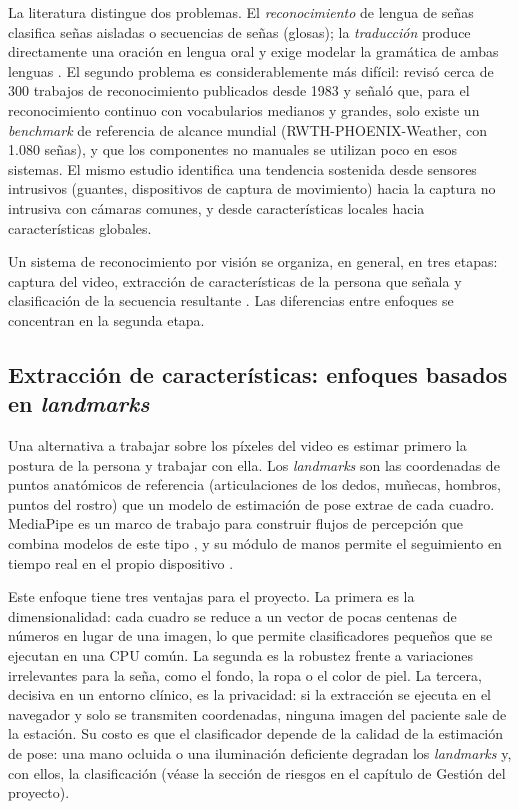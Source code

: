 La literatura distingue dos problemas. El \emph{reconocimiento} de lengua de señas clasifica señas aisladas o secuencias de señas (glosas); la \emph{traducción} produce directamente una oración en lengua oral y exige modelar la gramática de ambas lenguas \parencite{camgoz2018nslt,rastgoo2021survey}. El segundo problema es considerablemente más difícil: \textcite{koller2020survey} revisó cerca de 300 trabajos de reconocimiento publicados desde 1983 y señaló que, para el reconocimiento continuo con vocabularios medianos y grandes, solo existe un \emph{benchmark} de referencia de alcance mundial (RWTH-PHOENIX-Weather, con 1.080 señas), y que los componentes no manuales se utilizan poco en esos sistemas. El mismo estudio identifica una tendencia sostenida desde sensores intrusivos (guantes, dispositivos de captura de movimiento) hacia la captura no intrusiva con cámaras comunes, y desde características locales hacia características globales.

Un sistema de reconocimiento por visión se organiza, en general, en tres etapas: captura del video, extracción de características de la persona que señala y clasificación de la secuencia resultante \parencite{rastgoo2021survey}. Las diferencias entre enfoques se concentran en la segunda etapa.

\subsection{Extracción de características: enfoques basados en \emph{landmarks}}

Una alternativa a trabajar sobre los píxeles del video es estimar primero la postura de la persona y trabajar con ella. Los \emph{landmarks} son las coordenadas de puntos anatómicos de referencia (articulaciones de los dedos, muñecas, hombros, puntos del rostro) que un modelo de estimación de pose extrae de cada cuadro. MediaPipe es un marco de trabajo para construir flujos de percepción que combina modelos de este tipo \parencite{lugaresi2019mediapipe}, y su módulo de manos permite el seguimiento en tiempo real en el propio dispositivo \parencite{zhang2020mediapipehands}.

Este enfoque tiene tres ventajas para el proyecto. La primera es la dimensionalidad: cada cuadro se reduce a un vector de pocas centenas de números en lugar de una imagen, lo que permite clasificadores pequeños que se ejecutan en una CPU común. La segunda es la robustez frente a variaciones irrelevantes para la seña, como el fondo, la ropa o el color de piel. La tercera, decisiva en un entorno clínico, es la privacidad: si la extracción se ejecuta en el navegador y solo se transmiten coordenadas, ninguna imagen del paciente sale de la estación. Su costo es que el clasificador depende de la calidad de la estimación de pose: una mano ocluida o una iluminación deficiente degradan los \emph{landmarks} y, con ellos, la clasificación (véase la sección de riesgos en el capítulo de Gestión del proyecto).

